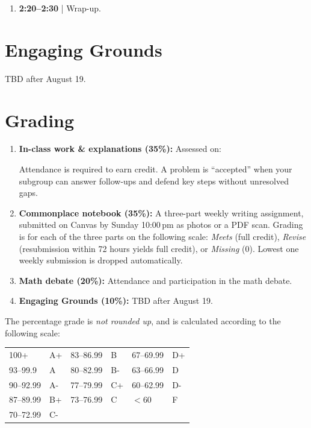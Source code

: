 \documentclass[oneside,11pt]{amsart}
\begin{document}
\begin{enumerate}[$\bullet$]
\item \textbf{2:20--2:30} | Wrap-up.
\end{enumerate}



\section{Engaging Grounds}

TBD after August 19.

\section{Grading}

\begin{enumerate}[$\bullet$]
\item \textbf{In-class work \& explanations (35\%):}
Assessed on:
Attendance is required to earn credit. A problem is ``accepted'' when your subgroup can answer follow-ups and defend key steps without unresolved gaps.

 \item \textbf{Commonplace notebook (35\%):}
	A three-part weekly writing assignment, submitted
	on Canvas by Sunday 10:00\,pm as photos or a PDF scan. 
	Grading is for each of the three parts on the following scale:
	\emph{Meets} (full credit), 
	\emph{Revise} 
	(resubmission within 72 hours yields full credit), or
	\emph{Missing} (0).
	Lowest one weekly submission is dropped
	automatically.

  \item \textbf{Math debate (20\%):}
	Attendance and participation in the math debate.

	\item \textbf{Engaging Grounds (10\%):}
	TBD after August 19.
\end{enumerate}

The percentage grade is \emph{not rounded up}, and is calculated 
according to the following scale:
\begin{center}
\begin{tabular}{ll|ll|ll}
100+ & A+ & 83--86.99 & B & 67--69.99 & D+ \\
93--99.9 & A & 80--82.99 & B- & 63--66.99 & D \\
90--92.99 & A- & 77--79.99 & C+ & 60--62.99 & D- \\
87--89.99 & B+ & 73--76.99 & C & $<60$ & F \\
70--72.99 & C- & & \\
\end{tabular}
\end{center}
\end{document}
